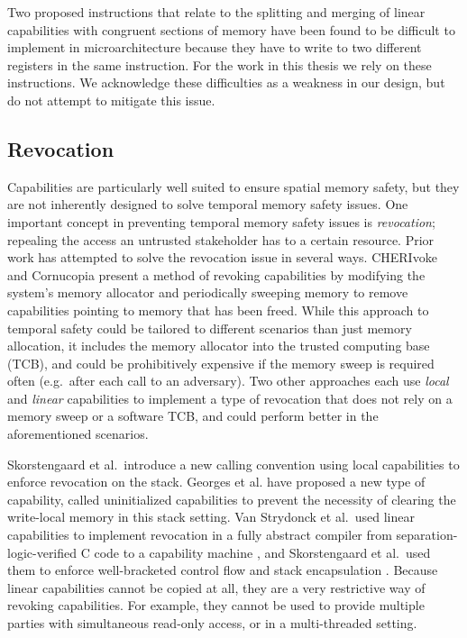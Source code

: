 Two proposed instructions that relate to the splitting and merging of linear capabilities with congruent sections of memory have been found to be difficult to implement in microarchitecture because they have to write to two different registers in the same instruction. For the work in this thesis we rely on these instructions. We acknowledge these difficulties as a weakness in our design, but do not attempt to mitigate this issue.

\subsection{Revocation}
Capabilities are particularly well suited to ensure spatial memory safety, but they are not inherently designed to solve temporal memory safety issues.
One important concept in preventing temporal memory safety issues is \textit{revocation}; repealing the access an untrusted stakeholder has to a certain resource.
Prior work has attempted to solve the revocation issue in several ways.
CHERIvoke \cite{xia_cherivoke_2019} and Cornucopia \cite{nathaniel_wesley_filardo_cornucopia_2020} present a method of revoking capabilities by modifying the system's memory allocator and periodically sweeping memory to remove capabilities pointing to memory that has been freed.
While this approach to temporal safety could be tailored to different scenarios than just memory allocation, it includes the memory allocator into the trusted computing base (TCB), and could be prohibitively expensive if the memory sweep is required often (e.g.\ after each call to an adversary).
Two other approaches each use \textit{local} and \textit{linear} capabilities to implement a type of revocation that does not rely on a memory sweep or a software TCB, and could perform better in the aforementioned scenarios.

Skorstengaard et al.\ introduce a new calling convention using local capabilities \cite{skorstengaard:esop18} to enforce revocation on the stack.
Georges et al. have proposed a new type of capability, called uninitialized capabilities \cite{georges_efficient_2021} to prevent the necessity of clearing the write-local memory in this stack setting.
Van Strydonck et al.\ used linear capabilities to implement revocation in a fully abstract compiler from separation-logic-verified C code to a capability machine \cite{van_strydonck_linear_2019}, and Skorstengaard et al.\ used them to enforce well-bracketed control flow and stack encapsulation \cite{skorstengaard:popl19}.
Because linear capabilities cannot be copied at all, they are a very restrictive way of revoking capabilities.
For example, they cannot be used to provide multiple parties with simultaneous read-only access, or in a multi-threaded setting.

